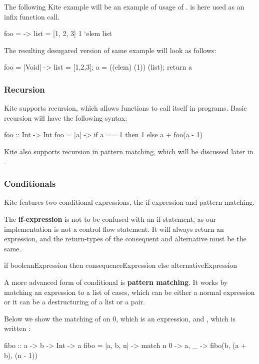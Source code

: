 The following Kite example will be an example of usage of .  is here used as an infix function call.
\begin{kite}
  foo =  -> {
    list = [1, 2, 3]
    1 `elem list
  }
\end{kite}
The resulting desugared version of same example will look as follows:

\begin{kite}
  foo = |Void| -> {
    list = [1,2,3];
    a = ((elem) (1)) (list);
    return a
  }
\end{kite}

\subsubsection{Recursion}
Kite supports recursion, which allows functions to call itself in programs. Basic recursion will have the following syntax:
\begin{kite}
  foo :: Int -> Int
  foo = |a| -> {
    if a == 1 then 1
    else a + foo(a - 1)
  }
\end{kite}

Kite also supports recursion in pattern matching, which will be discussed later in .

\subsubsection{Conditionals}
\label{subsubsec:conditionals}
Kite features two conditional expressions, the if-expression and pattern matching.

The \textbf{if-expression} is not to be confused with an if-statement, as our implementation is not a control flow statement. It will always return an expression, and the return-types of the consequent and alternative must be the same.

\begin{kite}
if booleanExpression then consequenceExpression else alternativeExpression
\end{kite}

A more advanced form of conditional is \textbf{pattern matching}. It works by matching an expression to a list of cases, which can be either a normal expression or it can be a destructuring of a list or a pair.

Below we show the matching of  on 0, which is an expression, and , which is written :

\begin{kite}
fibo :: a -> b -> Int -> a
fibo = |a, b, n| -> {
    match n {
    0 -> a,
    _ -> fibo(b, (a + b), (n - 1))
    }
}
\end{kite}

